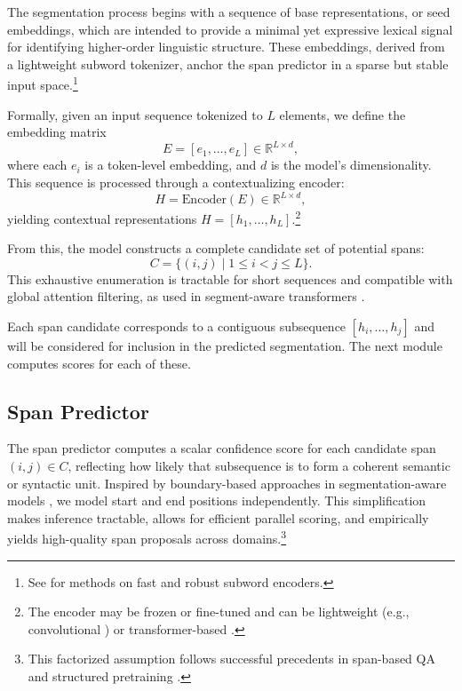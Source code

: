 The segmentation process begins with a sequence of base representations, or seed embeddings, which are intended to provide a minimal yet expressive lexical signal for identifying higher-order linguistic structure. These embeddings, derived from a lightweight subword tokenizer, anchor the span predictor in a sparse but stable input space.\footnote{See \cite{kudo2018sentencepiece, sennrich2016bpe, tay2021charformer} for methods on fast and robust subword encoders.}

Formally, given an input sequence tokenized to \(L\) elements, we define the embedding matrix
\[
  E = [e_1, \dots, e_L] \in \mathbb{R}^{L \times d},
\]
where each \(e_i\) is a token-level embedding, and \(d\) is the model’s dimensionality. This sequence is processed through a contextualizing encoder:
\[
  H = \mathrm{Encoder}(E) \in \mathbb{R}^{L \times d},
\]
yielding contextual representations \(H = [h_1, \dots, h_L]\).\footnote{The encoder may be frozen or fine-tuned and can be lightweight (e.g., convolutional \cite{tay2021charformer}) or transformer-based \cite{devlin2019bert, raffel2020t5}.}

From this, the model constructs a complete candidate set of potential spans:
\[
  C = \{(i,j) \mid 1 \le i < j \le L\}.
\]
This exhaustive enumeration is tractable for short sequences and compatible with global attention filtering, as used in segment-aware transformers \cite{joshi2020spanbert, zach2019segmenter, cao2021codegen}.

Each span candidate corresponds to a contiguous subsequence \([h_i, \dots, h_j]\) and will be considered for inclusion in the predicted segmentation. The next module computes scores for each of these.

\subsection{Span Predictor}

The span predictor computes a scalar confidence score for each candidate span \((i,j)\in C\), reflecting how likely that subsequence is to form a coherent semantic or syntactic unit. Inspired by boundary-based approaches in segmentation-aware models \cite{liu2022learnedsegmentation, joshi2020spanbert}, we model start and end positions independently. This simplification makes inference tractable, allows for efficient parallel scoring, and empirically yields high-quality span proposals across domains.\footnote{This factorized assumption follows successful precedents in span-based QA \cite{lee2016learning} and structured pretraining \cite{joshi2020spanbert}.}

